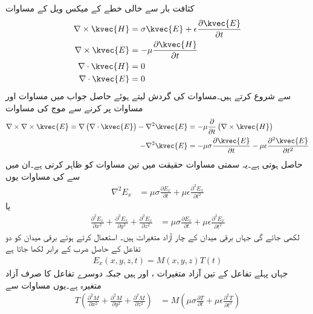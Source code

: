 کثافت بار سے خالی  خطے کے میکس ویل کے مساوات
\begin{align}
\nabla \times \kvec{H}&=\sigma \kvec{E}+\epsilon \frac{\partial \kvec{E}}{\partial t} \label{مساوات_مویج_مستطیلی_گمکیا_الف}\\
\nabla \times \kvec{E}&=-\mu \frac{\partial \kvec{H}}{\partial t} \label{مساوات_مویج_مستطیلی_گمکیا_ب}\\
\nabla \cdot \kvec{H}&=0 \label{مساوات_مویج_مستطیلی_گمکیا_پ}\\
\nabla \cdot \kvec{E}&=0 \label{مساوات_مویج_مستطیلی_گمکیا_ت}
\end{align}
 سے شروع کرتے ہیں۔مساوات  کی گردش لیتے ہوئے حاصل جواب میں مساوات  اور مساوات  پر کرنے سے موج کی مساوات 
\begin{align*}
\nabla \times \nabla \times \kvec{E}=\nabla \left(\nabla \cdot \kvec{E}\right)-\nabla^2 \kvec{E}&=-\mu \frac{\partial }{\partial t}\left(\nabla \times \kvec{H}\right)\\
-\nabla^2 \kvec{E}&=-\mu \sigma \frac{\partial \kvec{E}}{\partial t}-\mu\epsilon \frac{\partial^2 \kvec{E}}{\partial t^2}
\end{align*}
حاصل ہوتی ہے۔یہ سمتی مساوات حقیقت میں تین مساوات کو ظاہر کرتی ہے۔ان میں سے   کی مساوات یوں
\begin{align*}
\nabla^2 E_x&=\mu \sigma \frac{\partial E_x}{\partial t}+\mu\epsilon \frac{\partial^2 E_x}{\partial t^2}
\end{align*}
یا
\begin{align}\label{مساوات_مویج_مستطیلی_گمکیا_ٹ}
\frac{\partial^2 E_x}{\partial x^2}+\frac{\partial^2 E_x}{\partial y^2}+\frac{\partial^2 E_x}{\partial z^2}&=\mu \sigma \frac{\partial E_x}{\partial t}+\mu\epsilon \frac{\partial^2 E_x}{\partial t^2}
\end{align}
لکھی جائے گی جہاں برقی میدان  کے چار آزاد متغیرات ہیں۔ استعمال کرتے ہوئے  برقی میدان کو دو تفاعل کے حاصل ضرب کے برابر لکھا جاتا ہے
\begin{align}\label{مساوات_مویج_مستطیلی_گمکیا_ث}
E_x(x,y,z,t)=M(x,y,z) T(t)
\end{align} 
جہاں پہلے تفاعل  کے تین آزاد متغیرات ،  اور  ہیں جبکہ دوسرے تفاعل  کا صرف  آزاد متغیرہ ہے۔یوں مساوات  سے
\begin{align*}
T\left(\frac{\partial^2 M}{\partial x^2}+\frac{\partial^2 M}{\partial y^2}+\frac{\partial^2 M}{\partial z^2}\right)&=M\left(\mu \sigma \frac{\partial T}{\partial t}+\mu\epsilon \frac{\partial^2 T}{\partial t^2}\right)
\end{align*}
